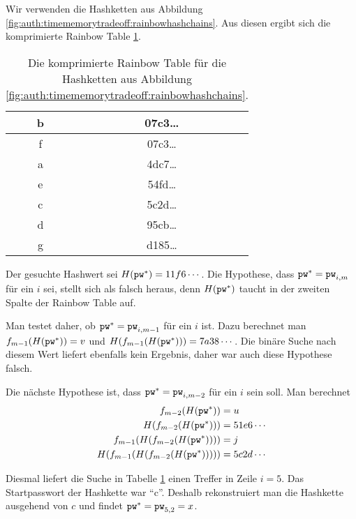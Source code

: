 \begin{beispiel} Wir verwenden die Hashketten aus Abbildung
\ref{fig:auth:timememorytradeoff:rainbowhashchains}. Aus diesen ergibt
sich die komprimierte Rainbow Table \ref{table:auth:rainbowtable}.
	
\begin{table}[h]
	\begin{center}
		\begin{tabular}{|c|c|} \hline b & 07c3\ldots\\\hline f &
07c3\ldots\\\hline a & 4dc7\ldots\\\hline e & 54fd\ldots\\\hline c &
5c2d\ldots\\\hline d & 95cb\ldots\\\hline g & d185\ldots\\\hline
		\end{tabular}
	\end{center}
	\caption{Die komprimierte Rainbow Table für die Hashketten aus
Abbildung \ref{fig:auth:timememorytradeoff:rainbowhashchains}.}
	\label{table:auth:rainbowtable}
\end{table}

Der gesuchte Hashwert sei $H(\texttt{pw}^*) = 11f6\cdots$.  Die
Hypothese, dass $\texttt{pw}^* = \texttt{pw}_{i,m}$ für ein $i$ sei, stellt sich als
falsch heraus, denn $H(\texttt{pw}^*)$ taucht in der zweiten Spalte der Rainbow
Table auf.
	
Man testet daher, ob $\texttt{pw}^* = \texttt{pw}_{i,m-1}$ für ein $i$ ist. Dazu
berechnet man $f_{m-1}(H(\texttt{pw}^*)) = v$ und $H(f_{m-1}(H(\texttt{pw}^*))) =
7a38\cdots$. Die binäre Suche nach diesem Wert liefert ebenfalls kein
Ergebnis, daher war auch diese Hypothese falsch.
	
	Die nächste Hypothese ist, dass $\texttt{pw}^* = \texttt{pw}_{i,m-2}$ für ein
$i$ sein soll.  Man berechnet 
\begin{align*}
f_{m-2}(H(\texttt{pw}^*)) &= u\\
H(f_{m-2}(H(\texttt{pw}^*))) &= 51e6\cdots\\
f_{m-1}(H(f_{m-2}(H(\texttt{pw}^*)))) &= j\\
H(f_{m-1}(H(f_{m-2}(H(\texttt{pw}^*))))) &= 5c2d\cdots  
\end{align*}

 Diesmal liefert die
Suche in Tabelle \ref{table:auth:rainbowtable} einen Treffer in Zeile $i
= 5$. Das Startpasswort der Hashkette war "`c"'. Deshalb rekonstruiert
man die Hashkette ausgehend von $c$ und findet $\texttt{pw}^* = \texttt{pw}_{5,2} =
x$.
\end{beispiel}

